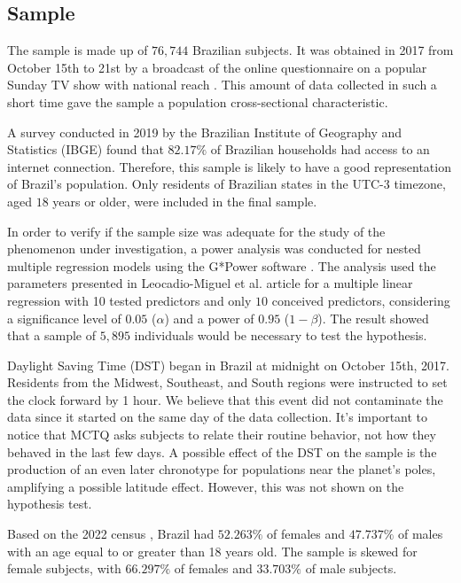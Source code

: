 \documentclass[
12pt,
openright,
oneside,
a4paper,
chapter=TITLE,
section=TITLE,
french,
spanish,
brazil,
english
]{abntex2}\usepackage{array}
\begin{document}
\subsection{Sample}\label{sample}

The sample is made up of \(76,744\) Brazilian subjects. It was obtained
in 2017 from October 15th to 21st by a broadcast of the online
questionnaire on a popular Sunday TV show with national reach
\autocite{redeglobo2017}. This amount of data collected in such a short
time gave the sample a population cross-sectional characteristic.

A survey conducted in 2019 by the Brazilian Institute of Geography and
Statistics (IBGE) \autocite*{ibge2021} found that \(82.17\%\) of
Brazilian households had access to an internet connection. Therefore,
this sample is likely to have a good representation of Brazil's
population. Only residents of Brazilian states in the UTC-3 timezone,
aged \(18\) years or older, were included in the final sample.

In order to verify if the sample size was adequate for the study of the
phenomenon under investigation, a power analysis was conducted for
nested multiple regression models using the G*Power software
\autocite{faul2007}. The analysis used the parameters presented in
Leocadio-Miguel et al. \autocite*{leocadio-miguel2017} article for a
multiple linear regression with 10 tested predictors and only \(10\)
conceived predictors, considering a significance level of \(0.05\)
(\(\alpha\)) and a power of \(0.95\) (\(1 - \beta\)). The result showed
that a sample of \(5,895\) individuals would be necessary to test the
hypothesis.

Daylight Saving Time (DST) began in Brazil at midnight on October 15th,
2017. Residents from the Midwest, Southeast, and South regions were
instructed to set the clock forward by 1 hour. We believe that this
event did not contaminate the data since it started on the same day of
the data collection. It's important to notice that MCTQ asks subjects to
relate their routine behavior, not how they behaved in the last few
days. A possible effect of the DST on the sample is the production of an
even later chronotype for populations near the planet's poles,
amplifying a possible latitude effect. However, this was not shown on
the hypothesis test.

Based on the 2022 census \autocite{ibgea}, Brazil had \(52.263\%\) of
females and \(47.737\%\) of males with an age equal to or greater than
18 years old. The sample is skewed for female subjects, with
\(66.297\%\) of females and \(33.703\%\) of male subjects.
\end{document}
